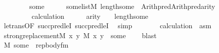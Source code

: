 \begin{isabellebody}
\ \ \isacommand{{\isacharbraceleft}{\kern0pt}}\isamarkupfalse%
\isanewline
\ \ \ \ \isamarkupfalse%
\ some\isanewline
\ \ \ \ \isamarkupfalse%
\ {\isachardoublequoteopen}some{\isasymin}list{\isacharparenleft}{\kern0pt}M{\isacharparenright}{\kern0pt}{\isachardoublequoteclose}\ {\isachardoublequoteopen}length{\isacharparenleft}{\kern0pt}some{\isacharparenright}{\kern0pt}\ {\isacharequal}{\kern0pt}\ Arith{\isachardot}{\kern0pt}pred{\isacharparenleft}{\kern0pt}Arith{\isachardot}{\kern0pt}pred{\isacharparenleft}{\kern0pt}arity{\isacharparenleft}{\kern0pt}{\isasymphi}{\isacharparenright}{\kern0pt}{\isacharparenright}{\kern0pt}{\isacharparenright}{\kern0pt}{\isachardoublequoteclose}\isanewline
\ \ \ \ \isamarkupfalse%
\isanewline
\ \ \ \ \isamarkupfalse%
\ {\isacartoucheopen}{\isasymphi}{\isasymin}{\isacharunderscore}{\kern0pt}{\isacartoucheclose}\isanewline
\ \ \ \ \isamarkupfalse%
\ \isamarkupfalse%
\ calculation\isanewline
\ \ \ \ \isamarkupfalse%
\ {\isachardoublequoteopen}arity{\isacharparenleft}{\kern0pt}{\isasymphi}{\isacharparenright}{\kern0pt}\ {\isasymle}\ {}\ {\isacharhash}{\kern0pt}{\isacharplus}{\kern0pt}\ length{\isacharparenleft}{\kern0pt}some{\isacharparenright}{\kern0pt}{\isachardoublequoteclose}\ \isanewline
\ \ \ \ \ \ \isamarkupfalse%
\ le{\isacharunderscore}{\kern0pt}trans{\isacharbrackleft}{\kern0pt}OF\ succpred{\isacharunderscore}{\kern0pt}leI{\isacharbrackright}{\kern0pt}\ succpred{\isacharunderscore}{\kern0pt}leI\ \isamarkupfalse%
\ simp\isanewline
\ \ \ \ \isamarkupfalse%
\ \isamarkupfalse%
\ calculation\ \ asm\isanewline
\ \ \ \ \isamarkupfalse%
\ {\isachardoublequoteopen}strong{\isacharunderscore}{\kern0pt}replacement{\isacharparenleft}{\kern0pt}{\isacharhash}{\kern0pt}{\isacharhash}{\kern0pt}M{\isacharcomma}{\kern0pt}\ {\isasymlambda}x\ y{\isachardot}{\kern0pt}\ M{\isacharcomma}{\kern0pt}\ {\isacharbrackleft}{\kern0pt}x{\isacharcomma}{\kern0pt}\ y{\isacharbrackright}{\kern0pt}\ {\isacharat}{\kern0pt}\ some\ {\isasymTurnstile}\ {\isasymphi}{\isacharparenright}{\kern0pt}{\isachardoublequoteclose}\ \isamarkupfalse%
\ blast\isanewline
\ \ \ \ \isamarkupfalse%
\isanewline
\ \ \ \ \isamarkupfalse%
\ {\isachardoublequoteopen}M{\isacharcomma}{\kern0pt}\ some\ {\isasymTurnstile}\ rep{\isacharunderscore}{\kern0pt}body{\isacharunderscore}{\kern0pt}fm{\isacharparenleft}{\kern0pt}{\isasymphi}{\isacharparenright}{\kern0pt}{\isachardoublequoteclose}\ \isanewline

\end{isabellebody}
